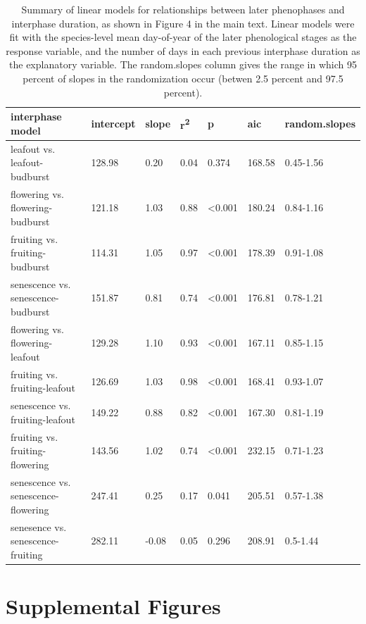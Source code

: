 \documentclass{article}
\begin{document}
\begin{table}[ht]
\centering
\caption{Summary of linear models for relationships between later phenophases and interphase duration, as shown in Figure 4 in the main text. Linear models were fit with the species-level mean day-of-year of the later phenological stages as the response variable, and the number of days in each previous interphase duration as the explanatory variable. The random.slopes column gives the range in which 95 percent of slopes in the randomization occur (betwen 2.5 percent and 97.5 percent).} 
\label{table:interphase}
\begin{tabular}{|p{}|p{}|p{}|p{}|p{}|p{}|p{}|}
  \hline
interphase model & intercept & slope & r\textsuperscript{2} & p & aic & random.slopes \\ 
  \hline
leafout vs. leafout-budburst & 128.98 & 0.20 & 0.04 & 0.374 & 168.58 & 0.45-1.56 \\ 
  flowering vs. flowering-budburst & 121.18 & 1.03 & 0.88 & <0.001 & 180.24 & 0.84-1.16 \\ 
  fruiting vs. fruiting-budburst & 114.31 & 1.05 & 0.97 & <0.001 & 178.39 & 0.91-1.08 \\ 
  senescence vs. senescence-budburst & 151.87 & 0.81 & 0.74 & <0.001 & 176.81 & 0.78-1.21 \\ 
  flowering vs. flowering-leafout & 129.28 & 1.10 & 0.93 & <0.001 & 167.11 & 0.85-1.15 \\ 
  fruiting vs. fruiting-leafout & 126.69 & 1.03 & 0.98 & <0.001 & 168.41 & 0.93-1.07 \\ 
  senescence vs. fruiting-leafout & 149.22 & 0.88 & 0.82 & <0.001 & 167.30 & 0.81-1.19 \\ 
  fruiting vs. fruiting-flowering & 143.56 & 1.02 & 0.74 & <0.001 & 232.15 & 0.71-1.23 \\ 
  senescence vs. senescence-flowering & 247.41 & 0.25 & 0.17 & 0.041 & 205.51 & 0.57-1.38 \\ 
  senesence vs. senescence-fruiting & 282.11 & -0.08 & 0.05 & 0.296 & 208.91 & 0.5-1.44 \\ 
   \hline
\end{tabular}
\end{table}\clearpage

\section* {Supplemental Figures}
\end{document}
